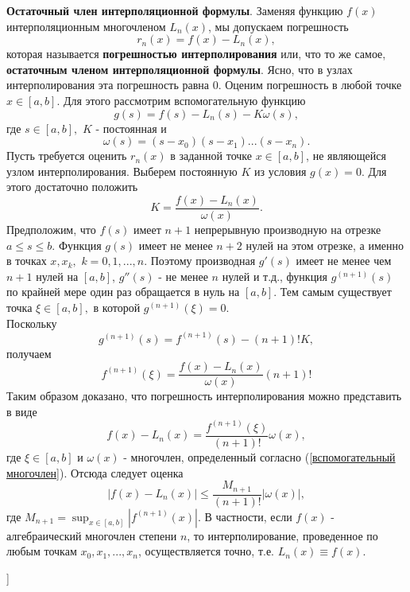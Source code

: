 \textbf{Остаточный член интерполяционной формулы}. Заменяя функцию $f(x)$ интерполяционным многочленом $L_n(x)$, мы допускаем погрешность
\begin{equation*}
    r_n(x) = f(x) - L_n(x),
\end{equation*}
которая называется \textbf{погрешностью интерполирования} или, что то же самое, \textbf{остаточным членом интерполяционной формулы}. Ясно, что в узлах интерполирования эта погрешность равна 0. Оценим погрешность в любой точке $x \in [a,b]$. Для этого рассмотрим вспомогательную функцию
\begin{equation*}
    g(s) = f(s) - L_n(s) - K\omega(s),
\end{equation*}
где $s \in [a,b],$ $K$ - постоянная и
\begin{equation}
    \label{вспомогательный многочлен}
    \omega(s) = (s-x_0)(s-x_1)...(s-x_n).
\end{equation}
Пусть требуется оценить $r_n(x)$ в заданной точке $x \in [a,b]$, не являющейся узлом интерполирования. Выберем постоянную $K$ из условия $g(x)=0.$ Для этого достаточно положить
\begin{equation*}
    K = \frac{f(x)-L_n(x)}{\omega(x)}.
\end{equation*}
Предположим, что $f(s)$ имеет $n+1$ непрерывную производную на отрезке $a \leq s \leq b.$ Функция $g(s)$ имеет не менее $n+2$ нулей на этом отрезке, а именно в точках $x, x_k,$ $k=0,1,...,n$. Поэтому производная $g'(s)$ имеет не менее чем $n+1$ нулей на $[a,b]$, $g''(s)$ - не менее $n$ нулей и т.д., функция $g^{(n+1)}(s)$ по крайней мере один раз обращается в нуль на $[a,b].$ Тем самым существует точка $\xi \in [a,b], $ в которой $g^{(n+1)}(\xi)=0$. \\
Поскольку
\begin{equation*}
    g^{(n+1)}(s) = f^{(n+1)}(s)-(n+1)!K,
\end{equation*}
получаем
\begin{equation*}
    f^{(n+1)}(\xi) = \frac{f(x)-L_n(x)}{\omega (x)} (n+1)!
\end{equation*}
Таким образом доказано, что погрешность интерполирования можно представить в виде
\begin{equation*}
    f(x)-L_n(x) = \frac{f^{(n+1)}(\xi)}{(n+1)!}\omega(x),
\end{equation*}
где $\xi \in [a,b]$ и $\omega(x)$ - многочлен, определенный согласно (\ref{вспомогательный многочлен}).
Отсюда следует оценка
\begin{equation*}
    |f(x)-L_n(x)| \leq \frac{M_{n+1}}{(n+1)!} |\omega(x)|,
\end{equation*}
где $M_{n+1} = \sup_{x \in [a,b]}|f^{(n+1)}(x)|.$ В частности, если $f(x)$ - алгебраический многочлен степени $n$, то интерполирование, проведенное по любым точкам $x_0, x_1, ..., x_n$, осуществляется точно, т.е. $L_n(x) \equiv f(x).$


\bigbreak
[\cite[page 127-129, 132-133]{chm_samarski_gulin}]
